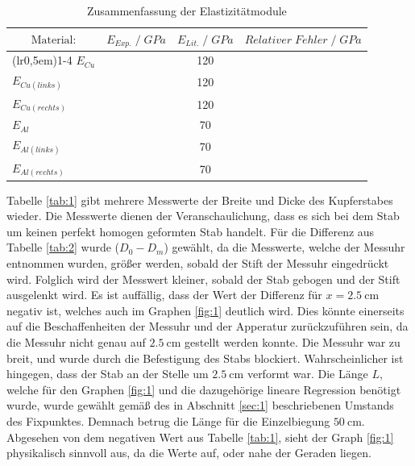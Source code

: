 \begin{table}[H]
\centering
    \begin{tabular}{l l c l}
    \toprule
        \multicolumn{1}{c}{$\text{Material:}$} & \multicolumn{1}{c}{$E_{Exp.}\;/\;GPa$} & \multicolumn{1}{c}{$E_{Lit.}\;/\;GPa$} & \multicolumn{1}{c}{$Relativer\;Fehler\;/\;GPa$}\\
        \cmidrule(lr{0,5em}){1-4}
        $E_{Cu}$            & \text{}    & 120   & \text{}\\
        $E_{Cu(links)}$     & \text{}   & 120   & \text{}\\
        $E_{Cu(rechts)}$    & \text{}   & 120   & \text{}\\
        $E_{Al}$            & \text{}    & 70    & \text{}\\
        $E_{Al(links)}$     & \text{}   & 70    & \text{}\\
        $E_{Al(rechts)}$    & \text{}   & 70    & \text{}\\
        \bottomrule
    \end{tabular}
\caption{Zusammenfassung der Elastizitätmodule}
\label{tab:7}
\end{table}
\justifying Tabelle \ref{tab:1} gibt mehrere Messwerte der Breite und Dicke des Kupferstabes wieder. Die Messwerte dienen der Veranschaulichung, dass es sich
bei dem Stab um keinen perfekt homogen geformten Stab handelt. Für die Differenz aus Tabelle \ref{tab:2} wurde ($D_0-D_m$) gewählt, da die Messwerte, 
welche der Messuhr entnommen wurden, größer werden, sobald der Stift der Messuhr eingedrückt wird. Folglich wird der Messwert kleiner, sobald der 
Stab gebogen und der Stift ausgelenkt wird. Es ist auffällig, dass der Wert der Differenz für  $x = \SI{2.5}{\centi\meter}$ negativ ist, 
welches auch im Graphen \ref{fig:1} deutlich wird. Dies könnte einerseits auf die Beschaffenheiten der Messuhr und der Apperatur zurückzuführen 
sein, da die Messuhr nicht genau auf $\SI{2.5}{\centi\meter}$ gestellt werden konnte. Die Messuhr war zu breit, und wurde durch die Befestigung des 
Stabs blockiert. Wahrscheinlicher ist hingegen, dass der Stab an der Stelle um $\SI{2.5}{\centi\meter}$ verformt war. Die Länge $L$, welche für den 
Graphen \ref{fig:1} und die dazugehörige lineare Regression benötigt wurde, wurde gewählt gemäß des in Abschnitt \ref{sec:1} beschriebenen Umstands des 
Fixpunktes. Demnach betrug die Länge für die Einzelbiegung $\SI{50}{\centi\meter}$. Abgesehen von dem negativen Wert aus Tabelle \ref{tab:1}, sieht 
der Graph \ref{fig:1} physikalisch sinnvoll aus, da die Werte auf, oder nahe der Geraden liegen. 

